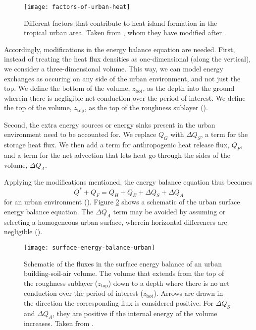 		\begin{figure}
			\centering
			\texttt{[image: factors-of-urban-heat]}
			\caption{
				Different factors that contribute to heat island formation in the tropical urban area.
				Taken from \textcite{Khan2021}, whom they have modified after \textcite{Kershaw2017}.
			}
			\label{fig:factors-of-urban-heat}
		\end{figure}
		
		Accordingly, modifications in the energy balance equation are needed.
		First, instead of treating the heat flux densities as one-dimensional (along the vertical),
			we consider a three-dimensional volume.
		This way, we can model energy exchanges as occuring on any side of the urban environment, and not just the top.
		We define the bottom of the volume, $z_\text{bot}$, as the depth into the ground wherein there is negligible net conduction over the period of interest.
		We define the top of the volume, $z_\text{top}$, as the top of the roughness sublayer (\cite{Oke2017urban}).
		
		Second, the extra energy sources or energy sinks present in the urban environment need to be accounted for.
		We replace $Q_G$ with $\Delta Q_S$, a term for the storage heat flux.
		We then add a term for anthropogenic heat release flux, $Q_F$, and
			a term for the net advection that lets heat go through the sides of the volume, $\Delta Q_A$.
		
		Applying the modifications mentioned, the energy balance equation thus becomes
		\begin{equation}
			Q^* + Q_F= Q_H + Q_E + \Delta Q_S + \Delta Q_A
		\end{equation}
		for an urban environment (\cite{Oke2017urban}).
		Figure \ref{fig:surface-energy-balance-urban} shows a schematic of the urban surface energy balance equation.
		The $\Delta Q_A$ term may be avoided by assuming or selecting a homogeneous urban surface, wherein horizontal differences are negligible (\cite{Oke2017urban}).
		
		\begin{figure}	
			\centering
			\texttt{[image: surface-energy-balance-urban]}
			\caption{
				Schematic of the fluxes in the surface energy balance of an urban building-soil-air volume. 
				The volume that extends from the top of the roughness sublayer ($z_\text{top}$) down to a depth where there is no net conduction over the period of interest ($z_\text{bot}$).
				Arrows are drawn in the direction the corresponding flux is considered positive.
				For $\Delta Q_S$ and $\Delta Q_A$, they are positive if the internal energy of the volume increases.
				Taken from \textcite{Oke2017urban}.
			}
			\label{fig:surface-energy-balance-urban}
		\end{figure}
	
